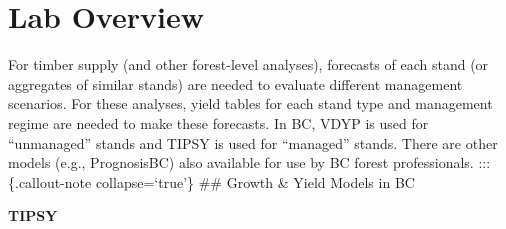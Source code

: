 \documentclass[
  letterpaper,
]{book}
\begin{document}
\hypertarget{lab-overview-5}{%
\section*{Lab Overview}\label{lab-overview-5}}


For timber supply (and other forest-level analyses), forecasts of each
stand (or aggregates of similar stands) are needed to evaluate different
management scenarios. For these analyses, yield tables for each stand
type and management regime are needed to make these forecasts. In BC,
VDYP is used for ``unmanaged'' stands and TIPSY is used for ``managed''
stands. There are other models (e.g., PrognosisBC) also available for
use by BC forest professionals. :::\{.callout-note collapse=`true'\}
\#\# Growth \& Yield Models in BC

\textbf{TIPSY}
\end{document}

